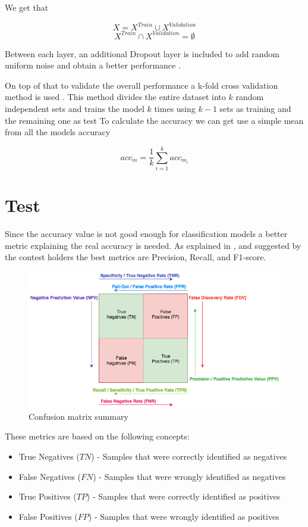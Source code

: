 We get that

$$X = X^{Train} \cup X^{Validation}$$
$$X^{Train} \cap X^{Validation} =  \emptyset $$

Between each layer, an additional Dropout layer is included to add random uniform noise and obtain a better performance \cite{Srivastava2014}.

On top of that to validate the overall performance a k-fold cross validation method is used \cite{Rodriguez2010}.
This method divides the entire dataset into $k$ random independent sets and trains the model $k$ times using $k - 1$ sets as training and the remaining one as test
To calculate the accuracy we can get use a simple mean from all the models accuracy

$$acc_{m} = \frac{1}{k}\sum_{i=1}^{k} acc_{m_{i}}$$

\newpage

\section{Test}
\label{test stage}

Since the accuracy value is not good enough for classification models a better metric explaining the real accuracy is needed. 
As explained in \cite{Flach2015}, \cite{Davis2006} and suggested by the contest holders the best metrics are Precision, Recall, and F1-score.
\begin{figure}[th]
    \centering
    \includegraphics[width=1.0\textwidth]{Figures/cm.png}
    \decoRule
    \caption{Confusion matrix summary}
    \label{fig:Confusion matrix summary}
\end{figure}
These metrics are based on the following concepts:
\begin{itemize}
	\item True Negatives ($TN$) - Samples that were correctly identified as negatives
	\item False Negatives ($FN$) - Samples that were wrongly identified as negatives
	\item True Positives ($TP$) - Samples that were correctly identified as positives
	\item False Positives ($FP$) - Samples that were wrongly identified as positives
\end{itemize}


